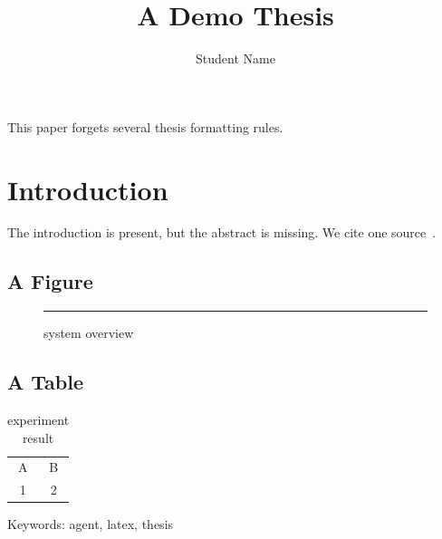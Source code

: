 \documentclass{article}
\title{A Demo Thesis}
\author{Student Name}
\begin{document}
\maketitle

This paper forgets several thesis formatting rules.

\section{Introduction}
The introduction is present, but the abstract is missing. We cite one source~\cite{smith2024agent}.

\subsection{A Figure}
\begin{figure}[htbp]
\centering
\rule{5cm}{3cm}
\caption{system overview}
\end{figure}

\subsection{A Table}
\begin{table}[htbp]
\centering
\caption{experiment result}
\begin{tabular}{cc}
A & B \\
1 & 2 \\
\end{tabular}
\end{table}

Keywords: agent, latex, thesis


\end{document}
